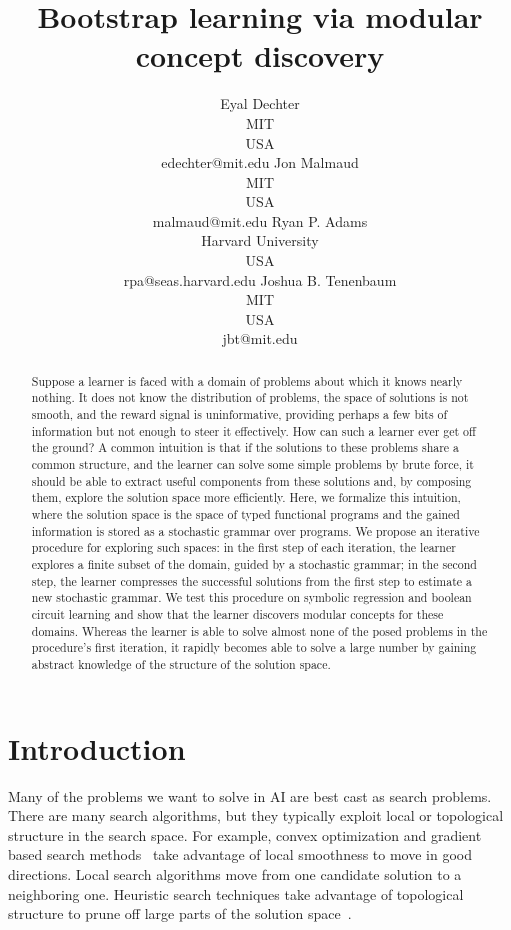 \documentclass{article}
\title{Bootstrap learning via modular concept discovery}
\author{Eyal Dechter \\
MIT\\
USA \\
edechter@mit.edu
\And
Jon Malmaud \\
MIT \\ 
USA \\
malmaud@mit.edu
\And 
Ryan P.  Adams \\
Harvard University\\
USA \\
rpa@seas.harvard.edu
\And
Joshua B. Tenenbaum \\
MIT\\
USA \\
jbt@mit.edu
}
\begin{document}
\maketitle

\begin{abstract}
 Suppose a learner is faced with a domain of problems about which it
 knows nearly nothing. It does not know the distribution of problems,
 the space of solutions is not smooth, and the reward signal is
 uninformative, providing perhaps a few bits of information but not
 enough to steer it effectively. How can such a learner ever get off
 the ground? A common intuition is that if the solutions to these
 problems share a common structure, and the learner can solve some
 simple problems by brute force, it should be able to extract useful
 components from these solutions and, by composing them, explore the
 solution space more efficiently. Here, we formalize this intuition,
 where the solution space is the space of typed functional programs
 and the gained information is stored as a stochastic grammar over
 programs. We propose an iterative procedure for exploring such
 spaces: in the first step of each iteration, the learner explores a
 finite subset of the domain, guided by a stochastic grammar; in the
 second step, the learner compresses the successful solutions from the
 first step to estimate a new stochastic grammar. We test this
 procedure on symbolic regression and boolean circuit learning and
 show that the learner discovers modular concepts for these
 domains. Whereas the learner is able to solve almost none of the
 posed problems in the procedure's first iteration, it rapidly becomes
 able to solve a large number by gaining abstract knowledge of the
 structure of the solution space.
 
 
\end{abstract}

\section{Introduction}
Many of the problems we want to solve in AI are best cast as search
problems. There are many search algorithms, but they typically exploit
local or topological structure in the search space. For example,
convex optimization and gradient based search methods~\cite{} take
advantage of local smoothness to move in good directions. Local search
algorithms move from one candidate solution to a neighboring
one\cite{}. Heuristic search techniques take advantage of topological
structure to prune off large parts of the solution space~\cite{}.
\end{document}
